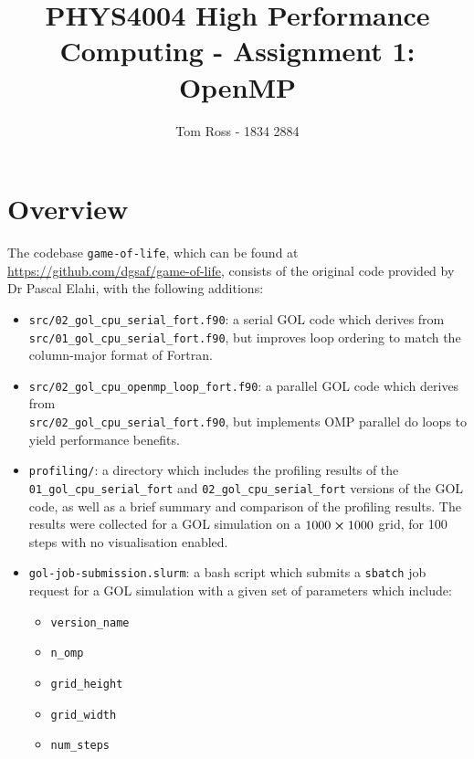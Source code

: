 \documentclass[]{article}
\title{PHYS4004 High Performance Computing - Assignment 1: OpenMP}
\author{Tom Ross - 1834 2884}
\date{}
\begin{document}
\tableofcontents

\newpage
\section{Overview}
\label{sec:Overview}

The codebase \lstinline[style=ff]{game-of-life}, which can be found at
\url{https://github.com/dgsaf/game-of-life}, consists of the original code
provided by Dr Pascal Elahi, with the following additions:
\begin{itemize}
\item \lstinline[style=ff]{src/02_gol_cpu_serial_fort.f90}: a serial GOL code
  which derives from \\ \lstinline[style=ff]{src/01_gol_cpu_serial_fort.f90},
  but improves loop ordering to match the column-major format of Fortran.

\item \lstinline[style=ff]{src/02_gol_cpu_openmp_loop_fort.f90}: a parallel GOL
  code which derives from \\
  \lstinline[style=ff]{src/02_gol_cpu_serial_fort.f90}, but implements OMP
  parallel do loops to yield performance benefits.

\item \lstinline[style=ff]{profiling/}: a directory which includes the profiling
  results of the \\ \lstinline[style=ff]{01_gol_cpu_serial_fort} and
  \lstinline[style=ff]{02_gol_cpu_serial_fort} versions of the GOL code, as well
  as a brief summary and comparison of the profiling results.
  The results were collected for a GOL simulation on a $1000\cross1000$ grid,
  for 100 steps with no visualisation enabled.

\item \lstinline[style=ff]{gol-job-submission.slurm}: a bash script which
  submits a \lstinline[style=ff]{sbatch} job request for a GOL simulation with a
  given set of parameters which include:
  \begin{itemize}
  \item \lstinline{version_name}

  \item \lstinline{n_omp}

  \item \lstinline{grid_height}

  \item \lstinline{grid_width}

  \item \lstinline{num_steps}


\end{itemize}
\end{itemize}
\end{document}
